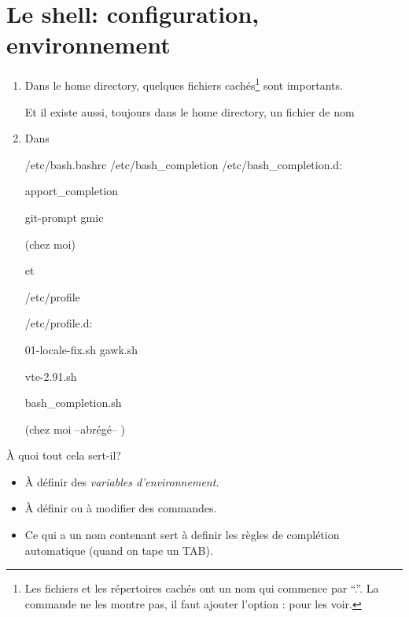 \section{Le shell: configuration, environnement}
\label{initshell}
\begin{enumerate}
\item Dans le home directory, quelques fichiers cachés\footnote{Les
  fichiers et les répertoires cachés ont un nom qui commence par ``.''.
  La commande  ne les montre pas, il faut ajouter l'option
  :  pour les voir.} sont importants.

  

Et il existe aussi, toujours dans le home directory, un fichier de nom

\item
  Dans 

  {
/etc/bash.bashrc  /etc/bash\_completion
/etc/bash\_completion.d:

\textsf{apport\_completion}

\textsf{git-prompt  gmic}
  }{(chez moi)}
  
  et

{
/etc/profile

/etc/profile.d:

\textsf{01-locale-fix.sh gawk.sh}

\textsf{vte-2.91.sh}

\textsf{bash\_completion.sh}


}{(chez moi --abrégé-- )}


\end{enumerate}

\`A quoi tout cela sert-il?
\begin{itemize}

\item \`A définir des \emph{variables d'environnement.}
\item \`A définir ou à modifier des commandes.
\item Ce qui a un nom contenant  sert à definir les
  règles de complétion automatique (quand on tape un TAB).
\end{itemize}

